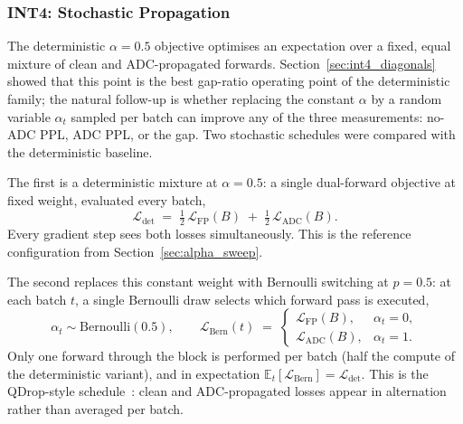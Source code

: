 \documentclass[a4paper,11pt,oneside]{article}
\theoremstyle{breakstyle}
\begin{document}
  \subsubsection{INT4: Stochastic Propagation}
  \label{sec:int4_stochastic}

  The deterministic $\alpha = 0.5$ objective optimises an expectation
  over a fixed, equal mixture of clean and ADC-propagated forwards.
  Section~\ref{sec:int4_diagonals} showed that this point is the best
  gap-ratio operating point of the deterministic family; the natural
  follow-up is whether replacing the constant $\alpha$ by a random
  variable $\alpha_t$ sampled per batch can improve any of the three
  measurements: no-ADC PPL, ADC PPL, or the gap.  Two stochastic
  schedules were compared with the deterministic baseline.

  The first is a deterministic mixture at $\alpha = 0.5$:
  a single dual-forward objective at fixed weight, evaluated every
  batch,
  \begin{equation}
      \mathcal{L}_{\mathrm{det}}
      \;=\;
      \tfrac{1}{2}\,\mathcal{L}_{\mathrm{FP}}(B)
      \;+\;
      \tfrac{1}{2}\,\mathcal{L}_{\mathrm{ADC}}(B).
  \end{equation}
  Every gradient step sees both losses simultaneously.  This is the
  reference configuration from Section~\ref{sec:alpha_sweep}.

  The second replaces this constant weight with Bernoulli switching
  at $p = 0.5$: at each batch $t$, a single Bernoulli draw selects
  which forward pass is executed,
  \begin{equation}
      \alpha_t \sim \mathrm{Bernoulli}(0.5),
      \qquad
      \mathcal{L}_{\mathrm{Bern}}(t)
      \;=\;
      \begin{cases}
        \mathcal{L}_{\mathrm{FP}}(B),  & \alpha_t = 0, \\
        \mathcal{L}_{\mathrm{ADC}}(B), & \alpha_t = 1.
      \end{cases}
  \end{equation}
  Only one forward through the block is performed per batch (half
  the compute of the deterministic variant), and in expectation
  $\mathbb{E}_t[\mathcal{L}_{\mathrm{Bern}}] = \mathcal{L}_{\mathrm{det}}$.
  This is the QDrop-style schedule~\cite{QDrop2022}: clean and
  ADC-propagated losses appear in alternation rather than averaged
  per batch.
\end{document}
